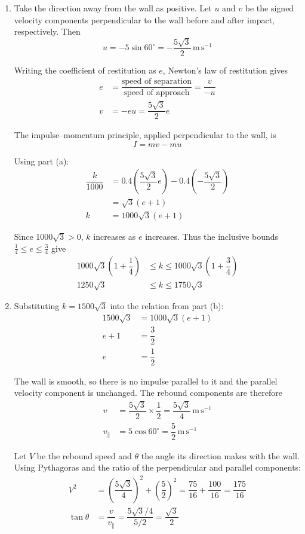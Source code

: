 \documentclass[leqno]{article}
\begin{document}
\begin{enumerate}[
  label=\textbf{\arabic*.},
  leftmargin=*,
  topsep=0pt,
  partopsep=0pt,
  parsep=0pt
]
\begin{djsSolution}
\begin{enumerate}[label=\textbf{(\alph*)}, start=1]
\item
Take the direction away from the wall as positive. Let \(u\) and \(v\) be the signed velocity components perpendicular to the wall before and after impact, respectively. Then
\[
u=-5\sin60^\circ=-\dfrac{5\sqrt3}{2}\,\mathrm{m\,s^{-1}}
\]

Writing the coefficient of restitution as \(e\), Newton's law of restitution gives
\begin{align*}
e&=\dfrac{\text{speed of separation}}{\text{speed of approach}}=\dfrac{v}{-u}\\
v&=-eu=\dfrac{5\sqrt3}{2}e
\end{align*}

The impulse--momentum principle, applied perpendicular to the wall, is
\[
I=mv-mu
\]

Using part (a):
\begin{align*}
\dfrac{k}{1000}
&=0.4\left(\dfrac{5\sqrt3}{2}e\right)-0.4\left(-\dfrac{5\sqrt3}{2}\right)\\
&=\sqrt3(e+1)\\
k&=1000\sqrt3(e+1)
\end{align*}

Since \(1000\sqrt3>0\), \(k\) increases as \(e\) increases. Thus the inclusive bounds \(\frac14\leq e\leq\frac34\) give
\begin{align*}
1000\sqrt3\left(1+\dfrac14\right)
&\leq k\leq1000\sqrt3\left(1+\dfrac34\right)\\
1250\sqrt3&\leq k\leq1750\sqrt3
\end{align*}

\item Substituting \(k=1500\sqrt3\) into the relation from part (b):
\begin{align*}
1500\sqrt3&=1000\sqrt3(e+1)\\
e+1&=\dfrac32\\
e&=\dfrac12
\end{align*}

The wall is smooth, so there is no impulse parallel to it and the parallel velocity component is unchanged. The rebound components are therefore
\begin{align*}
v&=\dfrac{5\sqrt3}{2}\times\dfrac12=\dfrac{5\sqrt3}{4}\,\mathrm{m\,s^{-1}}\\
v_{\parallel}&=5\cos60^\circ=\dfrac52\,\mathrm{m\,s^{-1}}
\end{align*}

Let \(V\) be the rebound speed and \(\theta\) the angle its direction makes with the wall. Using Pythagoras and the ratio of the perpendicular and parallel components:
\begin{align*}
V^2&=\left(\dfrac{5\sqrt3}{4}\right)^2+\left(\dfrac52\right)^2
=\dfrac{75}{16}+\dfrac{100}{16}=\dfrac{175}{16}\\
\tan\theta&=\dfrac{v}{v_{\parallel}}
=\dfrac{5\sqrt3/4}{5/2}=\dfrac{\sqrt3}{2}
\end{align*}


\end{enumerate}
\end{djsSolution}
\end{enumerate}
\end{document}
